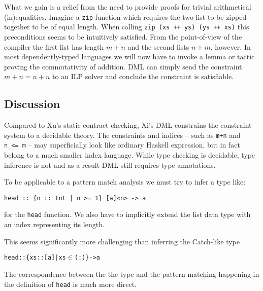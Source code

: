 \documentclass[a4paper]{report}
\begin{document}
What we gain is a relief from the need to provide proofs for trivial arithmetical (in)equalities. Imagine a {\tt zip} function which requires the two list to be zipped together to be of equal length. When calling {\tt zip (xs ++ ys) (ys ++ xs)} this preconditions seems to be intuitively satisfied. From the point-of-view of the compiler the first list has length $m+n$ and the second lists $n+m$, however. In most dependently-typed languages we will now have to invoke a lemma or tactic proving the commutativity of addition. DML can simply send the constraint $m + n = n + n$ to an ILP solver and conclude the constraint is satisfiable.

\subsection{Discussion}
Compared to Xu's static contract checking, Xi's DML constrains the constraint system to a decidable theory. The constraints and indices -- such as {\tt m+n} and {\tt n~<=~m} -- may superficially look like ordinary Haskell expression, but in fact belong to a much smaller index language. While type checking is decidable, type inference is not and as a result DML still requires type annotations.

To be applicable to a pattern match analysis we must try to infer a type like:
\begin{verbatim}
head :: {n :: Int | n >= 1} [a]<n> -> a
\end{verbatim}
for the {\tt head} function. We also have to implicitly extend the list data type with an index representing its length.

This seems significantly more challenging than inferring the Catch-like type
\begin{alltt}
head :: \{xs :: [a] | xs \(\in\) (:) \} -> a
\end{alltt}
The correspondence between the the type and the pattern matching happening in the definition of {\tt head} is much more direct.
\end{document}
